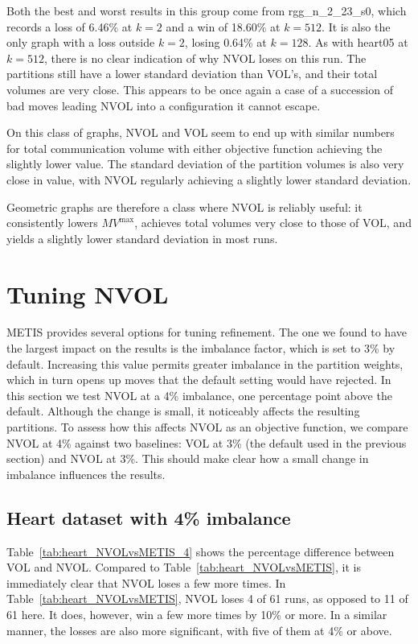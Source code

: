 Both the best and worst results in this group come from rgg\_n\_2\_23\_s0, which records a loss of 6.46\% at $k=2$ and a win of 18.60\% at $k=512$. It is also the only graph with a loss outside $k=2$, losing 0.64\% at $k=128$. As with heart05 at $k=512$, there is no clear indication of why NVOL loses on this run. The partitions still have a lower standard deviation than VOL's, and their total volumes are very close. This appears to be once again a case of a succession of bad moves leading NVOL into a configuration it cannot escape.

On this class of graphs, NVOL and VOL seem to end up with similar numbers for total communication volume with either objective function achieving the slightly lower value. The standard deviation of the partition volumes is also very close in value, with NVOL regularly achieving a slightly lower standard deviation. 

Geometric graphs are therefore a class where NVOL is reliably useful: it consistently lowers $MV^{\mathrm{max}}$, achieves total volumes very close to those of VOL, and yields a slightly lower standard deviation in most runs.

\section{Tuning NVOL}\label{sec:tuning}
METIS provides several options for tuning refinement. The one we found to have the largest impact on the results is the imbalance factor, which is set to 3\% by default. Increasing this value permits greater imbalance in the partition weights, which in turn opens up moves that the default setting would have rejected. In this section we test NVOL at a 4\% imbalance, one percentage point above the default. Although the change is small, it noticeably affects the resulting partitions. To assess how this affects NVOL as an objective function, we compare NVOL at 4\% against two baselines: VOL at 3\% (the default used in the previous section) and NVOL at 3\%. This should make clear how a small change in imbalance influences the results.


\subsection{Heart dataset with 4\% imbalance}
Table~\ref{tab:heart_NVOLvsMETIS_4} shows the percentage difference between VOL and NVOL. Compared to Table~\ref{tab:heart_NVOLvsMETIS}, it is immediately clear that NVOL loses a few more times. In Table~\ref{tab:heart_NVOLvsMETIS}, NVOL loses 4 of 61 runs, as opposed to 11 of 61 here. It does, however, win a few more times by 10\% or more. In a similar manner, the losses are also more significant, with five of them at 4\% or above.

